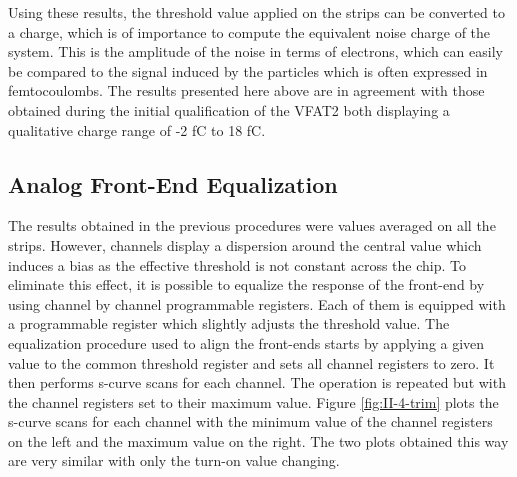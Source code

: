       Using these results, the threshold value applied on the strips can be converted to a charge, which is of importance to compute the equivalent noise charge of the system. This is the amplitude of the noise in terms of electrons, which can easily be compared to the signal induced by the particles which is often expressed in femtocoulombs. The results presented here above are in agreement with those obtained during the initial qualification of the VFAT2 \cite{Aspell:1267947} both displaying a qualitative charge range of -2 fC to 18 fC.

    \subsection{Analog Front-End Equalization}

      The results obtained in the previous procedures were values averaged on all the strips. However, channels display a dispersion around the central value which induces a bias as the effective threshold is not constant across the chip. To eliminate this effect, it is possible to equalize the response of the front-end by using channel by channel programmable registers. Each of them is equipped with a programmable register which slightly adjusts the threshold value. The equalization procedure used to align the front-ends starts by applying a given value to the common threshold register and sets all channel registers to zero. It then performs s-curve scans for each channel. The operation is repeated but with the channel registers set to their maximum value. Figure \ref{fig:II-4-trim} plots the s-curve scans for each channel with the minimum value of the channel registers on the left and the maximum value on the right. The two plots obtained this way are very similar with only the turn-on value changing. \\


